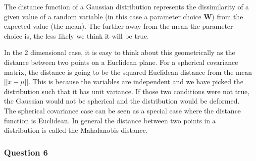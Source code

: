 \documentclass[10pt, a4paper, twocolumn]{article} %
\begin{document}
The distance function of a Gaussian distribution represents the dissimilarity of a given value of a random variable (in this case a parameter choice $\mathbf{W}$) from the expected value (the mean). The further away from the mean the parameter choice is, the less likely we think it will be true.

In the 2 dimensional case, it is easy to think about this geometrically as the distance between two points on a Euclidean plane. For a spherical covariance matrix, the distance is going to be the squared Euclidean distance from the mean $||x - \mu||$. This is because the variables are independent and we have picked the distribution such that it has unit variance. If those two conditions were not true, the Gaussian would not be spherical and the distribution would be deformed. The spherical covariance case can be seen as a special case where the distance function is Euclidean. In general the distance between two points in a distribution is called the Mahalanobis distance.

\subsubsection*{Question 6}
\end{document}

